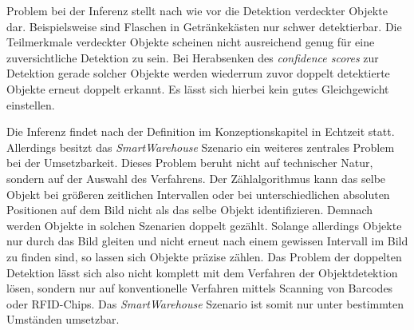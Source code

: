 Problem bei der Inferenz stellt nach wie vor die Detektion verdeckter Objekte dar. Beispielsweise sind Flaschen in Getränkekästen nur schwer detektierbar. Die Teilmerkmale verdeckter Objekte scheinen nicht ausreichend genug für eine zuversichtliche Detektion zu sein. Bei Herabsenken des \textit{confidence scores} zur Detektion gerade solcher Objekte werden wiederrum zuvor doppelt detektierte Objekte erneut doppelt erkannt. Es lässt sich hierbei kein gutes Gleichgewicht einstellen. 

Die Inferenz findet nach der Definition im Konzeptionskapitel in Echtzeit statt. Allerdings besitzt das \textit{SmartWarehouse} Szenario ein weiteres zentrales Problem bei der Umsetzbarkeit. Dieses Problem beruht nicht auf technischer Natur, sondern auf der Auswahl des Verfahrens. Der Zählalgorithmus kann das selbe Objekt bei größeren zeitlichen Intervallen oder bei unterschiedlichen absoluten Positionen auf dem Bild nicht als das selbe Objekt identifizieren. Demnach werden Objekte in solchen Szenarien doppelt gezählt. Solange allerdings Objekte nur durch das Bild \glqq gleiten\grqq{} und nicht erneut nach einem gewissen Intervall im Bild zu finden sind, so lassen sich Objekte präzise zählen. Das Problem der doppelten Detektion lässt sich also nicht komplett mit dem Verfahren der Objektdetektion lösen, sondern nur auf konventionelle Verfahren mittels Scanning von Barcodes oder RFID-Chips. Das \textit{SmartWarehouse} Szenario ist somit nur unter bestimmten Umständen umsetzbar. 
